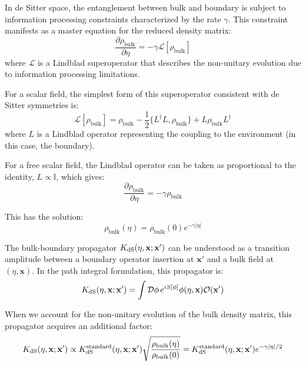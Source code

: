 \documentclass[11pt,english,twoside]{article}
\theoremstyle{plain}
\theoremstyle{definition}
\theoremstyle{remark}
\newcommand{\dS}{{\rm dS}}
\newcommand{\gammaR}{\gamma}
\newcommand{\xb}{\mathbf{x}}
\begin{document}
In de Sitter space, the entanglement between bulk and boundary is subject to information processing constraints characterized by the rate $\gammaR$. This constraint manifests as a master equation for the reduced density matrix:
\begin{equation}
\frac{\partial\rho_{\text{bulk}}}{\partial\eta} = -\gammaR \mathcal{L}[\rho_{\text{bulk}}]
\end{equation}
where $\mathcal{L}$ is a Lindblad superoperator that describes the non-unitary evolution due to information processing limitations.

For a scalar field, the simplest form of this superoperator consistent with de Sitter symmetries is:
\begin{equation}
\mathcal{L}[\rho_{\text{bulk}}] = \rho_{\text{bulk}} - \frac{1}{2}\{L^{\dagger}L, \rho_{\text{bulk}}\} + L\rho_{\text{bulk}}L^{\dagger}
\end{equation}
where $L$ is a Lindblad operator representing the coupling to the environment (in this case, the boundary).

For a free scalar field, the Lindblad operator can be taken as proportional to the identity, $L \propto \mathbb{I}$, which gives:
\begin{equation}
\frac{\partial\rho_{\text{bulk}}}{\partial\eta} = -\gammaR \rho_{\text{bulk}}
\end{equation}

This has the solution:
\begin{equation}
\rho_{\text{bulk}}(\eta) = \rho_{\text{bulk}}(0) e^{-\gammaR|\eta|}
\end{equation}

The bulk-boundary propagator $K_{\dS}(\eta,\xb;\xb')$ can be understood as a transition amplitude between a boundary operator insertion at $\xb'$ and a bulk field at $(\eta,\xb)$. In the path integral formulation, this propagator is:
\begin{equation}
K_{\dS}(\eta,\xb;\xb') = \int \mathcal{D}\phi \, e^{iS[\phi]} \phi(\eta,\xb) \mathcal{O}(\xb')
\end{equation}

When we account for the non-unitary evolution of the bulk density matrix, this propagator acquires an additional factor:
\begin{equation}
K_{\dS}(\eta,\xb;\xb') \propto K_{\dS}^{\text{standard}}(\eta,\xb;\xb') \sqrt{\frac{\rho_{\text{bulk}}(\eta)}{\rho_{\text{bulk}}(0)}} = K_{\dS}^{\text{standard}}(\eta,\xb;\xb') e^{-\gammaR|\eta|/2}
\end{equation}
\end{document}
